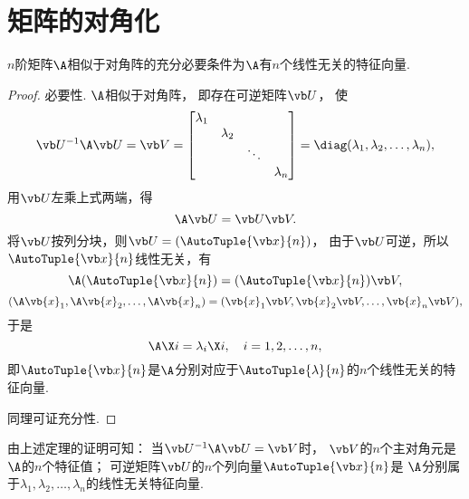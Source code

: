 \section{矩阵的对角化}
\begin{theorem}[矩阵可对角化的充分必要条件]\label{theorem:矩阵可对角化的充分必要条件.定理1}
\(n\)阶矩阵\(\A\)相似于对角阵的充分必要条件为\(\A\)有\(n\)个线性无关的特征向量.
\begin{proof}
必要性.
\(\A\)相似于对角阵，
即存在可逆矩阵\(\P\)，
使\[
	\P^{-1}\A\P=\V
	=\begin{bmatrix}
		\lambda_1 \\ & \lambda_2 \\ & & \ddots \\ & & &\lambda_n
	\end{bmatrix}
	=\diag(\lambda_1,\lambda_2,\dotsc,\lambda_n),
\]
用\(\P\)左乘上式两端，得\[
	\A\P=\P\V.
\]
将\(\P\)按列分块，则\(\P=(\AutoTuple{\x}{n})\)，
由于\(\P\)可逆，所以\(\AutoTuple{\x}{n}\)线性无关，有\[
	\A(\AutoTuple{\x}{n})=(\AutoTuple{\x}{n})\V,
\]\[
	(\A\vb{x}_1,\A\vb{x}_2,\dotsc,\A\vb{x}_n)=(\vb{x}_1\V,\vb{x}_2\V,\dotsc,\vb{x}_n\V),
\]
于是\[
	\A\X i=\lambda_i\X i,
	\quad i=1,2,\dotsc,n,
\]
即\(\AutoTuple{\x}{n}\)是\(\A\)分别对应于\(\AutoTuple{\lambda}{n}\)的\(n\)个线性无关的特征向量.

同理可证充分性.
\end{proof}
\end{theorem}

由上述定理的证明可知：
{\color{red}当\(\P^{-1}\A\P=\V\)时，
\(\V\)的\(n\)个主对角元是\(\A\)的\(n\)个特征值；
可逆矩阵\(\P\)的\(n\)个列向量\(\AutoTuple{\x}{n}\)是
\(\A\)分别属于\(\lambda_1,\lambda_2,\dotsc,\lambda_n\)的线性无关特征向量.}

